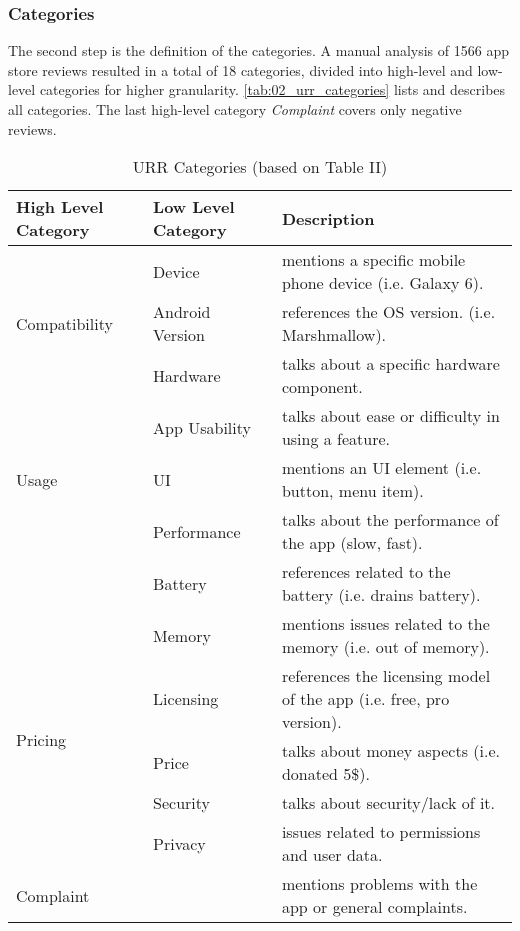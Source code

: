 \subsubsection{Categories}

The second step is the definition of the categories. A manual analysis of 1566 app store reviews resulted in a total of 18 categories, divided into high-level and low-level categories for higher granularity. \autoref{tab:02_urr_categories} lists and describes all categories. The last high-level category \textit{Complaint} covers only negative reviews.

\begin{table}
    \centering
    \caption{URR Categories (based on \cite{Ciurumelea.2017} Table II)}
    \begin{tabular}{l|l|p{6cm}} \hline
        High Level Category & Low Level Category & Description \\ \hline\hline
        \multirow{3}{*}{Compatibility}   & Device            & mentions a specific mobile phone device (i.e. Galaxy 6). \\
        & Android Version   &  references the OS version. (i.e. Marshmallow). \\
        & Hardware          & talks about a specific hardware component. \\ \hline
        \multirow{3}{*}{Usage}   & App Usability            & talks about ease or difficulty in using a feature.\\
        & UI          & mentions an UI element (i.e. button, menu item). \\ \hline
        \multirow{3}{*}{Resources}  & Performance          & talks about the performance of the app (slow, fast). \\
        & Battery          & references related to the battery (i.e. drains battery).\\
        & Memory          & mentions issues related to the memory (i.e. out of memory).\\ \hline
        \multirow{3}{*}{Pricing}  & Licensing          & references the licensing model of the app (i.e. free, pro version). \\
        & Price          & talks about money aspects (i.e. donated 5\$). \\ \hline
        \multirow{3}{*}{Protection}  & Security          &  talks about security/lack of it.\\
        & Privacy          & issues related to permissions and user data. \\ \hline
        Complaint  &           &  mentions problems with the app or general complaints.\\ \hline
    \end{tabular}
    \label{tab:02_urr_categories}
\end{table}

